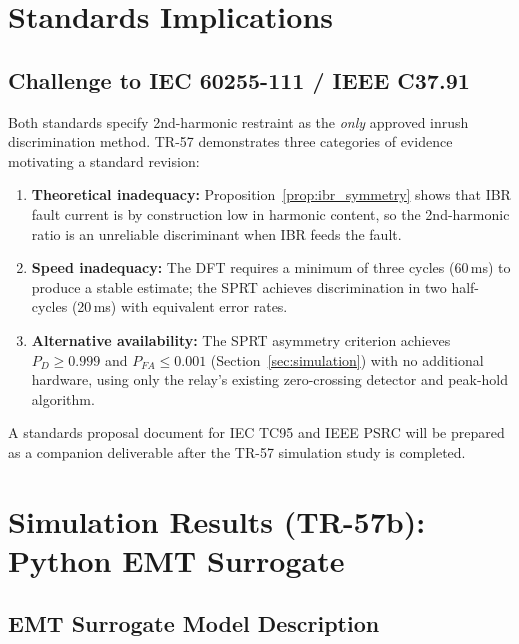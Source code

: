 \documentclass[11pt, a4paper]{article}
\begin{document}
\section{Standards Implications}
\label{sec:standards}

\subsection{Challenge to IEC 60255-111 / IEEE C37.91}

Both standards specify 2nd-harmonic restraint as the \emph{only} approved
inrush discrimination method.  TR-57 demonstrates three categories of evidence
motivating a standard revision:

\begin{enumerate}
  \item \textbf{Theoretical inadequacy:} Proposition~\ref{prop:ibr_symmetry}
    shows that IBR fault current is by construction low in harmonic content,
    so the 2nd-harmonic ratio is an unreliable discriminant when IBR feeds
    the fault.

  \item \textbf{Speed inadequacy:} The DFT requires a minimum of three cycles
    (60\,ms) to produce a stable estimate; the SPRT achieves discrimination
    in two half-cycles (20\,ms) with equivalent error rates.

  \item \textbf{Alternative availability:} The SPRT asymmetry criterion achieves
    $P_D \geq 0.999$ and $P_{FA} \leq 0.001$ (Section~\ref{sec:simulation})
    with no additional hardware, using only the relay's existing zero-crossing
    detector and peak-hold algorithm.
\end{enumerate}

A standards proposal document for IEC TC95 and IEEE PSRC will be prepared
as a companion deliverable after the TR-57 simulation study is completed.

\section{Simulation Results (TR-57b): Python EMT Surrogate}
\label{sec:tr57b}

\subsection{EMT Surrogate Model Description}
\end{document}
